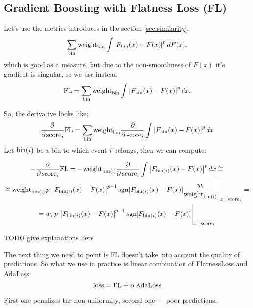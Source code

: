 \subsection{Gradient Boosting with Flatness Loss (FL)}

Let's use the metrics introduces in the section \ref{sec:similarity}:
\[
	\sum_{\text{bin}} \text{weight}_\text{bin} \int \left\vert F_{\text{bin}}(x) - F(x)\right\vert^p dF(x),
\]
which is good as a measure, but due to the non-smoothness of $F(x)$ it's 
gradient is singular, so we use instead
\[
	\text{FL} = \sum_{\text{bin}} \text{weight}_\text{bin} \int \left\vert F_{\text{bin}}(x) - F(x)\right\vert^p dx.
\]

So, the derivative looks like:
\[
	\dfrac{\partial} {\partial \, \text{score}_i} \text{FL}
	= \sum_{\text{bin}} \text{weight}_\text{bin} \frac{\partial }{ \partial \, \text{score}_i} 
			\int \left\vert F_{\text{bin}}(x) - F(x)\right\vert^p dx
\]
Let $\text{bin}(i)$ be a bin to which event $i$ belongs, then we can compute:
\def\binIweight{\text{weight}_\text{\bin(i)}}


\begin{multline*}
	- \dfrac{\partial} {\partial \, \score_i} \FL = 
		- \binIweight
		\frac{\partial }{ \partial \, \score_i} 
			\int \abs{F_{\bin(i)}(x) - F(x)}^p dx \cong \\
	\cong \binIweight \, p \,  \abs{F_{\bin(i)}(x) - F(x)}^{p-1} 
		\sgn[F_{\bin(i)}(x) - F(x)]
		\dfrac{w_i}{\binIweight}
		\Bigg|_{x=\score_i} = \\
	= 
		w_i \, p \,  \abs{F_{\bin(i)}(x) - F(x)}^{p-1}
		\sgn[F_{\bin(i)}(x) - F(x)]
		\Bigg|_{x=\score_i}
\end{multline*}

TODO give explanations here

The next thing we need to point is FL doesn't take into account the quality of predictions. So what we use in practice is linear combination of FlatnessLoss and AdaLoss:
\[
	\text{loss} = \text{FL} + \alpha \, \text{AdaLoss}
\]

First one penalizes the non-uniformity, second one --- poor predictions.
